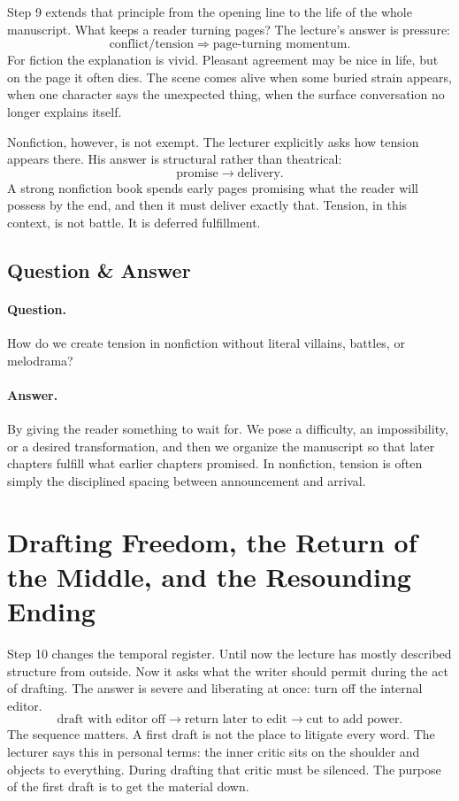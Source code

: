 Step 9 extends that principle from the opening line to the life of the whole manuscript. What keeps a reader turning pages? The lecture's answer is pressure:
\begin{equation}
\text{conflict/tension} \Rightarrow \text{page-turning momentum}.
\end{equation}
For fiction the explanation is vivid. Pleasant agreement may be nice in life, but on the page it often dies. The scene comes alive when some buried strain appears, when one character says the unexpected thing, when the surface conversation no longer explains itself.

Nonfiction, however, is not exempt. The lecturer explicitly asks how tension appears there. His answer is structural rather than theatrical:
\begin{equation}
\text{promise} \to \text{delivery}.
\end{equation}
A strong nonfiction book spends early pages promising what the reader will possess by the end, and then it must deliver exactly that. Tension, in this context, is not battle. It is deferred fulfillment.

\subsection{Question \& Answer}

\paragraph{Question.} How do we create tension in nonfiction without literal villains, battles, or melodrama?

\paragraph{Answer.} By giving the reader something to wait for. We pose a difficulty, an impossibility, or a desired transformation, and then we organize the manuscript so that later chapters fulfill what earlier chapters promised. In nonfiction, tension is often simply the disciplined spacing between announcement and arrival.

\section{Drafting Freedom, the Return of the Middle, and the Resounding Ending}

Step 10 changes the temporal register. Until now the lecture has mostly described structure from outside. Now it asks what the writer should permit during the act of drafting. The answer is severe and liberating at once: turn off the internal editor.
\begin{equation}
\text{draft with editor off} \to \text{return later to edit} \to \text{cut to add power}.
\end{equation}
The sequence matters. A first draft is not the place to litigate every word. The lecturer says this in personal terms: the inner critic sits on the shoulder and objects to everything. During drafting that critic must be silenced. The purpose of the first draft is to get the material down.

